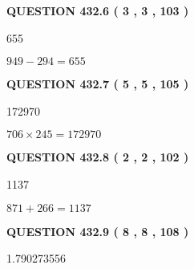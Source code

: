 \documentclass{ctexart}
\begin{document}
\vspace{0.2in}
  
{\textbf{\Large{QUESTION
432.6 
 ( 3 , 3 , 103 )
}}}
  
  
 
 
\noindent{}

655
 
 
 
 
\noindent{}

$ %
949 -  %
294=   %
655$
 
 
  
\vspace{0.2in}
  
{\textbf{\Large{QUESTION
432.7 
 ( 5 , 5 , 105 )
}}}
  
  
 
 
\noindent{}

172970
 
 
 
 
\noindent{}

$ %
706 \times  %
245=   %
172970$
 
 
  
\vspace{0.2in}
  
{\textbf{\Large{QUESTION
432.8 
 ( 2 , 2 , 102 )
}}}
  
  
 
 
\noindent{}

1137
 
 
 
 
\noindent{}

$ %
871 +  %
266=   %
1137$
 
 
  
\vspace{0.2in}
  
{\textbf{\Large{QUESTION
432.9 
 ( 8 , 8 , 108 )
}}}
  
  
 
 
\noindent{}

1.790273556
 
 
 
\end{document}

